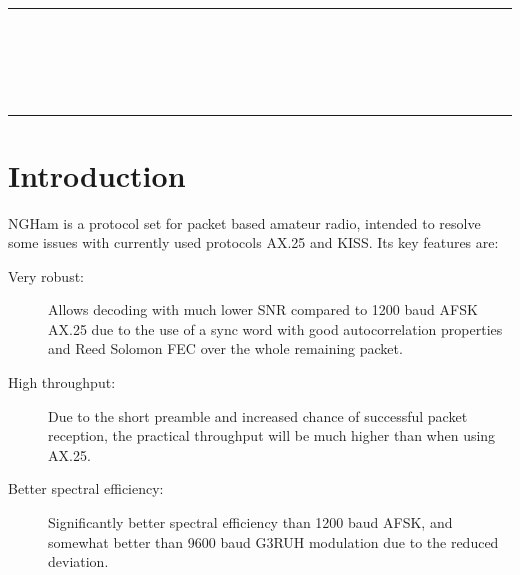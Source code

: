 \documentclass[a4paper, english, 12pt, hidelinks]{article}
\newcommand{\HRule}{\rule{\linewidth}{0.5mm}}
\begin{document}
\begin{titlepage}

    \begin{centering}
\vspace*{\fill}
	    {\color{medium-gray}\HRule}
	    \\[0.6cm]
	    \color{dark-gray}
        \\[0.2cm]
        \\[0.2cm]
        \\[0.2cm]
	    {\color{medium-gray}\HRule}
\vspace*{\fill}
    \end{centering}
\end{titlepage}

\tableofcontents
\clearpage

\section{Introduction}
    NGHam is a protocol set for packet based amateur radio, intended to resolve some issues with
    currently used protocols AX.25 and KISS. Its key features are:

    \begin{description}
        \item[Very robust:] Allows decoding with much lower SNR compared to 1200 baud AFSK AX.25 due to the 
        use of a sync word with good autocorrelation properties and Reed Solomon FEC over the whole
        remaining packet.
        \item[High throughput:] Due to the short preamble and increased chance of successful packet reception,
        the practical throughput will be much higher than when using AX.25.
        \item[Better spectral efficiency:] Significantly better spectral efficiency than 1200 baud AFSK, and
        somewhat better than 9600 baud G3RUH modulation due to the reduced deviation.
    \end{description}
\end{document}
